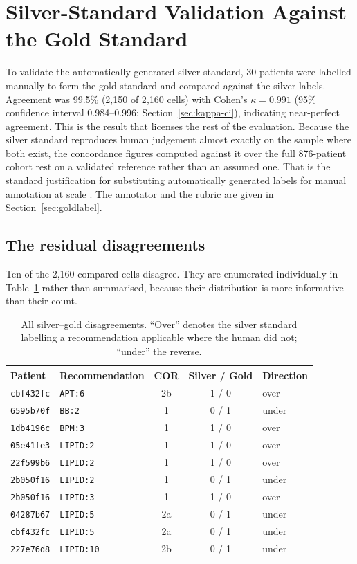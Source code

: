 \section{Silver-Standard Validation Against the Gold Standard}
\label{sec:gold}

To validate the automatically generated silver standard, 30 patients were
labelled manually to form the gold standard and compared against the silver labels.
Agreement was 99.5\% (2{,}150 of 2{,}160 cells) with Cohen's
$\kappa = 0.991$ (95\% confidence interval 0.984--0.996; Section~\ref{sec:kappa-ci}),
indicating near-perfect agreement. This is the result that
licenses the rest of the evaluation. Because the silver standard reproduces human
judgement almost exactly on the sample where both exist, the concordance figures computed
against it over the full 876-patient cohort rest on a validated reference
rather than an assumed one. That is the standard justification for substituting
automatically generated labels for manual annotation at scale
\cite{rebholz2011,nogues2022}. The annotator and the rubric are given in Section~\ref{sec:goldlabel}.

\subsection{The residual disagreements}
Ten of the 2{,}160 compared cells disagree. They are enumerated individually in
Table~\ref{tab:disagreements} rather than summarised, because their distribution is more
informative than their count.

\begin{table}[h]
\centering
\caption{All silver--gold disagreements. ``Over'' denotes the silver standard labelling a
recommendation applicable where the human did not; ``under'' the reverse.}
\label{tab:disagreements}
\footnotesize
\begin{tabular}{llccl}
\hline
\textbf{Patient} & \textbf{Recommendation} & \textbf{COR} & \textbf{Silver / Gold}
& \textbf{Direction} \\
\hline
\texttt{cbf432fc} & \texttt{APT:6}    & 2b & 1 / 0 & over  \\
\texttt{6595b70f} & \texttt{BB:2}     & 1  & 0 / 1 & under \\
\texttt{1db4196c} & \texttt{BPM:3}    & 1  & 1 / 0 & over  \\
\texttt{05e41fe3} & \texttt{LIPID:2}  & 1  & 1 / 0 & over  \\
\texttt{22f599b6} & \texttt{LIPID:2}  & 1  & 1 / 0 & over  \\
\texttt{2b050f16} & \texttt{LIPID:2}  & 1  & 0 / 1 & under \\
\texttt{2b050f16} & \texttt{LIPID:3}  & 1  & 1 / 0 & over  \\
\texttt{04287b67} & \texttt{LIPID:5}  & 2a & 0 / 1 & under \\
\texttt{cbf432fc} & \texttt{LIPID:5}  & 2a & 0 / 1 & under \\
\texttt{227e76d8} & \texttt{LIPID:10} & 2b & 0 / 1 & under \\
\hline
\end{tabular}
\end{table}

